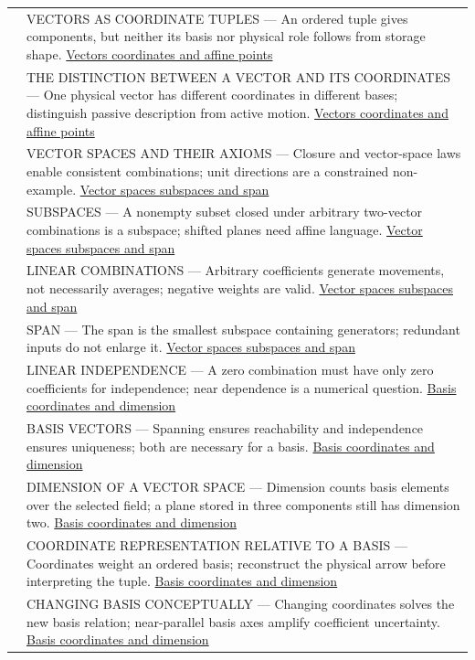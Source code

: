 {\begin{longtable}[]{@{}
  >{\raggedright\arraybackslash}p{}
  >{\raggedright\arraybackslash}p{}@{}}
505 & VECTORS AS COORDINATE TUPLES --- An ordered tuple gives components, but neither its basis nor physical role follows from storage shape. \hyperref[appendix-0659864c0aa3]{Vectors coordinates and affine points} \\
506 & THE DISTINCTION BETWEEN A VECTOR AND ITS COORDINATES --- One physical vector has different coordinates in different bases; distinguish passive description from active motion. \hyperref[appendix-0659864c0aa3]{Vectors coordinates and affine points} \\
507 & VECTOR SPACES AND THEIR AXIOMS --- Closure and vector-space laws enable consistent combinations; unit directions are a constrained non-example. \hyperref[appendix-173b52c063ae]{Vector spaces subspaces and span} \\
508 & SUBSPACES --- A nonempty subset closed under arbitrary two-vector combinations is a subspace; shifted planes need affine language. \hyperref[appendix-173b52c063ae]{Vector spaces subspaces and span} \\
509 & LINEAR COMBINATIONS --- Arbitrary coefficients generate movements, not necessarily averages; negative weights are valid. \hyperref[appendix-173b52c063ae]{Vector spaces subspaces and span} \\
510 & SPAN --- The span is the smallest subspace containing generators; redundant inputs do not enlarge it. \hyperref[appendix-173b52c063ae]{Vector spaces subspaces and span} \\
511 & LINEAR INDEPENDENCE --- A zero combination must have only zero coefficients for independence; near dependence is a numerical question. \hyperref[appendix-ce0341f7ea0d]{Basis coordinates and dimension} \\
512 & BASIS VECTORS --- Spanning ensures reachability and independence ensures uniqueness; both are necessary for a basis. \hyperref[appendix-ce0341f7ea0d]{Basis coordinates and dimension} \\
513 & DIMENSION OF A VECTOR SPACE --- Dimension counts basis elements over the selected field; a plane stored in three components still has dimension two. \hyperref[appendix-ce0341f7ea0d]{Basis coordinates and dimension} \\
514 & COORDINATE REPRESENTATION RELATIVE TO A BASIS --- Coordinates weight an ordered basis; reconstruct the physical arrow before interpreting the tuple. \hyperref[appendix-ce0341f7ea0d]{Basis coordinates and dimension} \\
515 & CHANGING BASIS CONCEPTUALLY --- Changing coordinates solves the new basis relation; near-parallel basis axes amplify coefficient uncertainty. \hyperref[appendix-ce0341f7ea0d]{Basis coordinates and dimension} \\

\end{longtable}}
